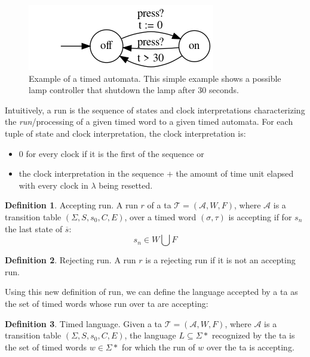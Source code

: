 \documentclass[12pt]{article}
\theoremstyle{definition}
\newtheorem{definition}{Definition}[section]
\theoremstyle{definition}
\newtheorem{example}{Example}[section]
\theoremstyle{remark}
\newcommand{\A}{\mathcal{A}}
\begin{document}
\begin{figure}
    \centering
    \includegraphics[scale=0.8]{timed_automata_lamp.png}
    \caption{Example of a timed automata. This simple example shows a possible lamp controller that shutdown the lamp after 30 seconds.}
    \label{timed_automata_lamp}
\end{figure}

Intuitively, a run is the sequence of states and clock interpretations characterizing the \textit{run}/processing of a given timed word to a given timed automata. For each tuple of state and clock interpretation, the clock interpretation is:
\begin{itemize}
\item $0$ for every clock if it is the first of the sequence or
\item the clock interpretation in the sequence $+$ the amount of time unit elapsed with every clock in $\lambda$ being resetted.
\end{itemize}

\theoremstyle{definition}
\begin{definition}{Accepting run.} A run $r$ of a \gls{ta} $\mathcal{T} = (\A, W, F)$, where $\A$ is a transition table $(\Sigma, S, s_{0},C, E)$, over a timed word $(\sigma, \tau)$ is accepting if for $s_{n}$ the last state of $\overline{s}$:
$$s_{n} \in W \bigcup F$$
\end{definition}

\theoremstyle{definition}
\begin{definition}{Rejecting run.} A run $r$ is a rejecting run if it is not an accepting run.
\end{definition}

Using this new definition of run, we can define the language accepted by a \gls{ta} as the set of timed words whose run over \gls{ta} are accepting:

\theoremstyle{definition}
\begin{definition}{Timed language.} Given a \gls{ta} $\mathcal{T} = (\A, W, F)$, where $\A$ is a transition table $(\Sigma, S, s_{0},C, E)$, the language $L \subseteq \Sigma*$ recognized by the \gls{ta} is the set of timed words $w \in \Sigma*$ for which the run of $w$ over the \gls{ta} is accepting.
\end{definition}
\end{document}
